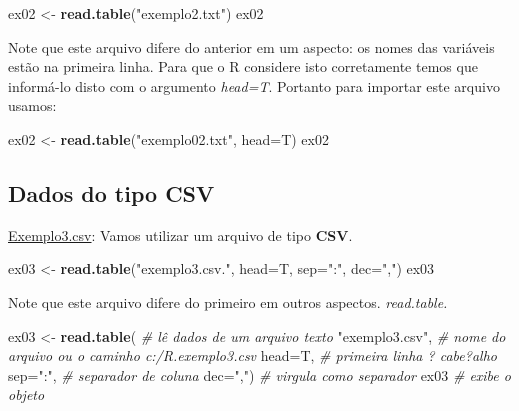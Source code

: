 \documentclass[
]{book}
\newenvironment{Shaded}{\begin{snugshade}}{\end{snugshade}}
\newcommand{\CommentTok}[1]{\textcolor[rgb]{0.56,0.35,0.01}{\textit{#1}}}
\newcommand{\DataTypeTok}[1]{\textcolor[rgb]{0.13,0.29,0.53}{#1}}
\newcommand{\KeywordTok}[1]{\textcolor[rgb]{0.13,0.29,0.53}{\textbf{#1}}}
\newcommand{\NormalTok}[1]{#1}
\newcommand{\StringTok}[1]{\textcolor[rgb]{0.31,0.60,0.02}{#1}}
\begin{document}
\begin{Shaded}
\begin{Highlighting}[]
\NormalTok{ex02 <-}\StringTok{ }\KeywordTok{read.table}\NormalTok{(}\StringTok{"exemplo2.txt"}\NormalTok{) }
\NormalTok{ex02}
\end{Highlighting}
\end{Shaded}

Note que este arquivo difere do anterior em um aspecto: os nomes das variáveis estão na primeira linha. Para que o R considere isto corretamente temos que informá-lo disto com o argumento \emph{head=T}. Portanto para importar este arquivo usamos:

\begin{Shaded}
\begin{Highlighting}[]
\NormalTok{ex02 <-}\StringTok{ }\KeywordTok{read.table}\NormalTok{(}\StringTok{"exemplo02.txt"}\NormalTok{, }\DataTypeTok{head=}\NormalTok{T) }
\NormalTok{ex02}
\end{Highlighting}
\end{Shaded}

\hypertarget{dados-do-tipo-csv}{%
\subsection{Dados do tipo CSV}\label{dados-do-tipo-csv}}

\href{https://www.dropbox.com/s/mv13cmkysw2nizm/exemplo3.csv?dl=1}{Exemplo3.csv}: Vamos utilizar um arquivo de tipo \textbf{CSV}.

\begin{Shaded}
\begin{Highlighting}[]
\NormalTok{ex03 <-}\StringTok{ }\KeywordTok{read.table}\NormalTok{(}\StringTok{"exemplo3.csv."}\NormalTok{, }\DataTypeTok{head=}\NormalTok{T, }\DataTypeTok{sep=}\StringTok{":"}\NormalTok{, }\DataTypeTok{dec=}\StringTok{","}\NormalTok{) }
\NormalTok{ex03}
\end{Highlighting}
\end{Shaded}

Note que este arquivo difere do primeiro em outros aspectos.
\emph{read.table.}

\begin{Shaded}
\begin{Highlighting}[]
\NormalTok{ex03 <-}\StringTok{ }\KeywordTok{read.table}\NormalTok{(       }\CommentTok{# lê dados de um arquivo texto}
  \StringTok{"exemplo3.csv"}\NormalTok{,         }\CommentTok{# nome do arquivo ou o caminho c:/R.exemplo3.csv}
  \DataTypeTok{head=}\NormalTok{T,                 }\CommentTok{# primeira linha ? cabe?alho}
  \DataTypeTok{sep=}\StringTok{":"}\NormalTok{,                }\CommentTok{# separador de coluna }
  \DataTypeTok{dec=}\StringTok{","}\NormalTok{)                }\CommentTok{# virgula como separador}
\NormalTok{ex03                      }\CommentTok{# exibe o objeto}
\end{Highlighting}
\end{Shaded}
\end{document}
